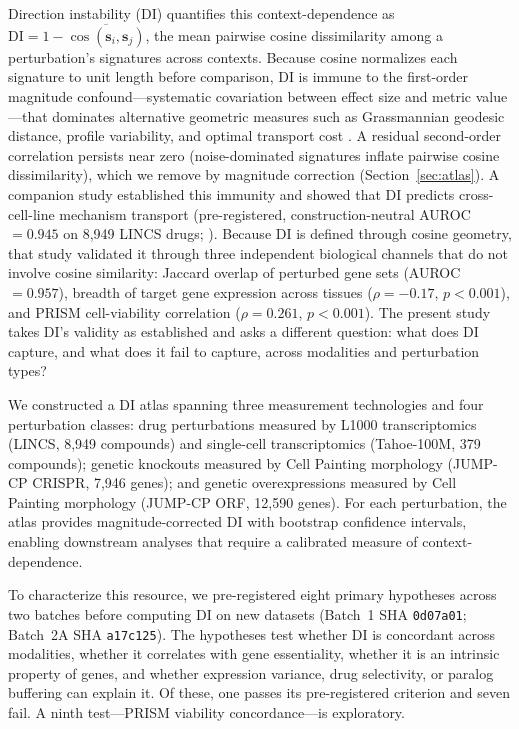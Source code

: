 \documentclass[11pt]{article}
\begin{document}
Direction instability (DI) quantifies this context-dependence as
$\mathrm{DI} = 1 - \overline{\cos(\mathbf{s}_i, \mathbf{s}_j)}$, the
mean pairwise cosine dissimilarity among a perturbation's signatures
across contexts.  Because cosine normalizes each signature to unit
length before comparison, DI is immune to the first-order magnitude
confound---systematic covariation between effect size and metric
value---that dominates alternative geometric measures such as
Grassmannian geodesic distance, profile variability, and optimal
transport cost \citep{tower2026confound}.  A residual second-order
correlation persists near zero (noise-dominated signatures inflate
pairwise cosine dissimilarity), which we remove by magnitude correction
(Section~\ref{sec:atlas}).  A companion study established this immunity and showed that DI predicts
cross-cell-line mechanism transport (pre-registered,
construction-neutral AUROC $= 0.945$ on 8{,}949 LINCS drugs;
\citealp{tower2026confound}).  Because DI is defined through cosine
geometry, that study validated it through three independent biological
channels that do not involve cosine similarity: Jaccard overlap of
perturbed gene sets (AUROC $= 0.957$), breadth of target gene expression
across tissues ($\rho = -0.17$, $p < 0.001$), and PRISM cell-viability
correlation ($\rho = 0.261$, $p < 0.001$).  The present study takes
DI's validity as established and asks a different question: what does DI
capture, and what does it fail to capture, across modalities and
perturbation types?

We constructed a DI atlas spanning three measurement technologies and
four perturbation classes: drug perturbations measured by L1000
transcriptomics (LINCS, 8{,}949 compounds) and single-cell
transcriptomics (Tahoe-100M, 379 compounds); genetic knockouts measured
by Cell Painting morphology (JUMP-CP CRISPR, 7{,}946 genes); and
genetic overexpressions measured by Cell Painting morphology (JUMP-CP
ORF, 12{,}590 genes).  For each perturbation, the atlas provides
magnitude-corrected DI with bootstrap confidence intervals, enabling
downstream analyses that require a calibrated measure of
context-dependence.

To characterize this resource, we pre-registered eight primary
hypotheses across two batches before computing DI on new datasets
(Batch~1 SHA \texttt{0d07a01}; Batch~2A SHA \texttt{a17c125}).  The
hypotheses test whether DI is concordant across modalities,
whether it correlates with gene essentiality, whether it is an
intrinsic property of genes, and whether expression variance,
drug selectivity, or paralog buffering can explain it.
Of these, one passes its pre-registered criterion and seven fail.  A
ninth test---PRISM viability concordance---is exploratory.
\end{document}

